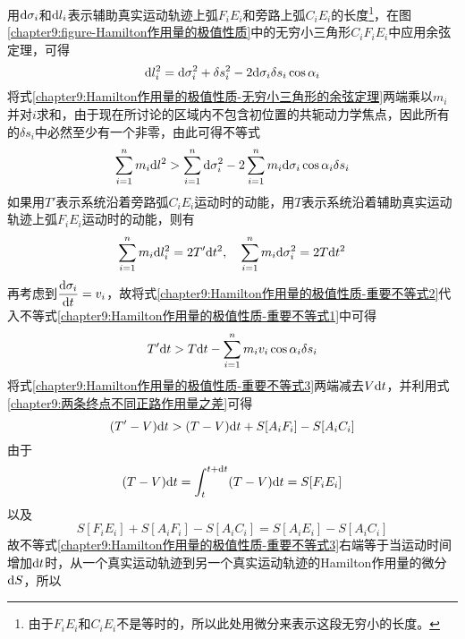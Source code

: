 用$\mathrm{d} \sigma_i$和$\mathrm{d} l_i$表示辅助真实运动轨迹上弧$F_iE_i$和旁路上弧$C_iE_i$的长度\footnote{由于$F_iE_i$和$C_iE_i$不是等时的，所以此处用微分来表示这段无穷小的长度。}，在图\ref{chapter9:figure-Hamilton作用量的极值性质}中的无穷小三角形$C_iF_iE_i$中应用余弦定理，可得
\begin{equation}
	\mathrm{d} l_i^2 = \mathrm{d} \sigma_i^2 + \delta s_i^2 - 2\mathrm{d} \sigma_i\delta s_i\cos\alpha_i
	\label{chapter9:Hamilton作用量的极值性质-无穷小三角形的余弦定理}
\end{equation}
将式\eqref{chapter9:Hamilton作用量的极值性质-无穷小三角形的余弦定理}两端乘以$m_i$并对$i$求和，由于现在所讨论的区域内不包含初位置的共轭动力学焦点，因此所有的$\delta s_i$中必然至少有一个非零，由此可得不等式
\begin{equation}
	\sum_{i=1}^n m_i\mathrm{d} l^2 > \sum_{i=1}^n \mathrm{d} \sigma_i^2 - 2\sum_{i=1}^n m_i\mathrm{d}\sigma_i\cos\alpha_i\delta s_i
	\label{chapter9:Hamilton作用量的极值性质-重要不等式1}
\end{equation}
如果用$T'$表示系统沿着旁路弧$C_iE_i$运动时的动能，用$T$表示系统沿着辅助真实运动轨迹上弧$F_iE_i$运动时的动能，则有
\begin{equation}
	\sum_{i=1}^n m_i\mathrm{d} l_i^2 = 2T'\mathrm{d} t^2 ,\quad \sum_{i=1}^n m_i\mathrm{d} \sigma_i^2 = 2T\mathrm{d} t^2 
	\label{chapter9:Hamilton作用量的极值性质-重要不等式2}
\end{equation}
再考虑到$\dfrac{\mathrm{d} \sigma_i}{\mathrm{d} t} = v_i$，故将式\eqref{chapter9:Hamilton作用量的极值性质-重要不等式2}代入不等式\eqref{chapter9:Hamilton作用量的极值性质-重要不等式1}中可得
\begin{equation}
	T'\mathrm{d} t > T\mathrm{d} t - \sum_{i=1}^n m_iv_i\cos\alpha_i\delta s_i
	\label{chapter9:Hamilton作用量的极值性质-重要不等式3}
\end{equation}
将式\eqref{chapter9:Hamilton作用量的极值性质-重要不等式3}两端减去$V\mathrm{d} t$，并利用式\eqref{chapter9:两条终点不同正路作用量之差}可得
\begin{equation}
	(T'-V)\mathrm{d} t > (T-V)\mathrm{d} t + S[A_iF_i]-S[A_iC_i]
	\label{chapter9:Hamilton作用量的极值性质-重要不等式4}
\end{equation}
由于
\begin{equation*}
	(T-V)\mathrm{d} t = \int_t^{t+\mathrm{d} t} (T-V)\mathrm{d} t = S[F_iE_i]
\end{equation*}
以及
\begin{equation*}
	S[F_iE_i]+S[A_iF_i]-S[A_iC_i] = S[A_iE_i]-S[A_iC_i]
\end{equation*}
故不等式\eqref{chapter9:Hamilton作用量的极值性质-重要不等式3}右端等于当运动时间增加$\mathrm{d} t$时，从一个真实运动轨迹到另一个真实运动轨迹的Hamilton作用量的微分$\mathrm{d} S$，所以
